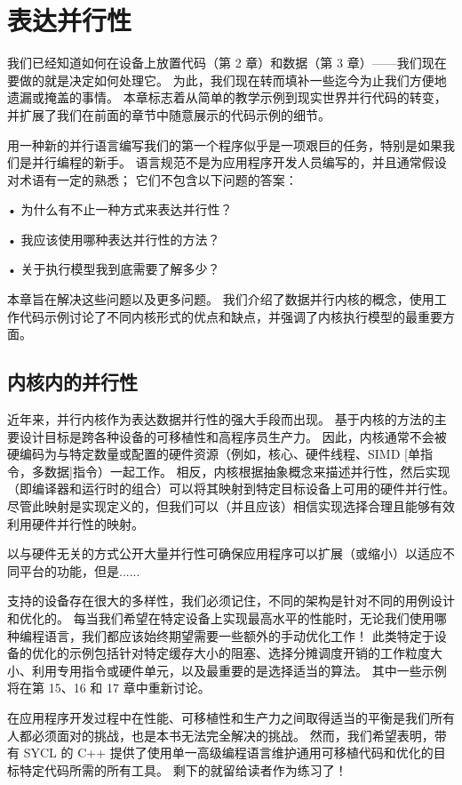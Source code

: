\section{表达并行性}
我们已经知道如何在设备上放置代码（第 2 章）和数据（第 3 章）——我们现在要做的就是决定如何处理它。 
为此，我们现在转而填补一些迄今为止我们方便地遗漏或掩盖的事情。 
本章标志着从简单的教学示例到现实世界并行代码的转变，并扩展了我们在前面的章节中随意展示的代码示例的细节。

用一种新的并行语言编写我们的第一个程序似乎是一项艰巨的任务，特别是如果我们是并行编程的新手。 语言规范不是为应用程序开发人员编写的，并且通常假设对术语有一定的熟悉； 它们不包含以下问题的答案：

• 为什么有不止一种方式来表达并行性？

• 我应该使用哪种表达并行性的方法？

• 关于执行模型我到底需要了解多少？

本章旨在解决这些问题以及更多问题。 我们介绍了数据并行内核的概念，使用工作代码示例讨论了不同内核形式的优点和缺点，并强调了内核执行模型的最重要方面。

\subsection{内核内的并行性}
近年来，并行内核作为表达数据并行性的强大手段而出现。 基于内核的方法的主要设计目标是跨各种设备的可移植性和高程序员生产力。 因此，内核通常不会被硬编码为与特定数量或配置的硬件资源（例如，核心、硬件线程、SIMD [单指令，多数据]指令）一起工作。 相反，内核根据抽象概念来描述并行性，然后实现（即编译器和运行时的组合）可以将其映射到特定目标设备上可用的硬件并行性。 尽管此映射是实现定义的，但我们可以（并且应该）相信实现选择合理且能够有效利用硬件并行性的映射。

以与硬件无关的方式公开大量并行性可确保应用程序可以扩展（或缩小）以适应不同平台的功能，但是......

支持的设备存在很大的多样性，我们必须记住，不同的架构是针对不同的用例设计和优化的。 每当我们希望在特定设备上实现最高水平的性能时，无论我们使用哪种编程语言，我们都应该始终期望需要一些额外的手动优化工作！ 此类特定于设备的优化的示例包括针对特定缓存大小的阻塞、选择分摊调度开销的工作粒度大小、利用专用指令或硬件单元，以及最重要的是选择适当的算法。 其中一些示例将在第 15、16 和 17 章中重新讨论。

在应用程序开发过程中在性能、可移植性和生产力之间取得适当的平衡是我们所有人都必须面对的挑战，也是本书无法完全解决的挑战。 然而，我们希望表明，带有 SYCL 的 C++ 提供了使用单一高级编程语言维护通用可移植代码和优化的目标特定代码所需的所有工具。 剩下的就留给读者作为练习了！

